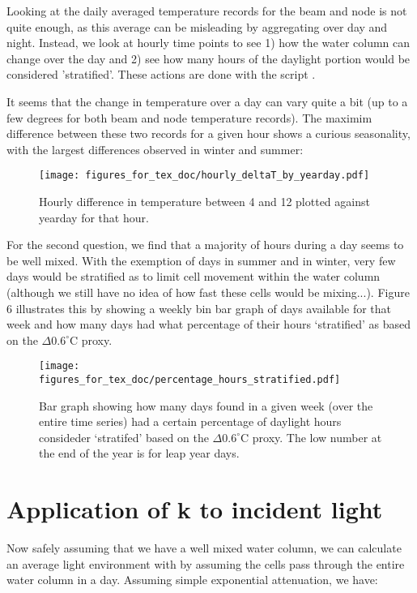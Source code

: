 \documentclass[11pt]{article}
\begin{document}
Looking at the daily averaged temperature records for the beam and node is not quite enough, as this average can be misleading by aggregating over day and night. Instead, we look at hourly time points to see 1) how the water column can change over the day and 2) see how many hours of the daylight portion would be considered 'stratified'. These actions are done with the script .

It seems that the change in temperature over a day can vary quite a bit (up to a few degrees for both beam and node temperature records). The maximim difference between these two records for a given hour shows a curious seasonality, with the largest differences observed in winter and summer:

 \begin{figure}[h]
\centering
\texttt{[image: figures\_for\_tex\_doc/hourly\_deltaT\_by\_yearday.pdf]}
\caption{Hourly difference in temperature between 4 and 12 plotted against yearday for that hour.}
\end{figure}

For the second question, we find that a majority of hours during a day seems to be well mixed. With the exemption of days in summer and in winter, very few days would be stratified as to limit cell movement within the water column (although we still have no idea of how fast these cells would be mixing...).  Figure 6 illustrates this by showing a weekly bin bar graph of days available for that week and how many days had what percentage of their hours `stratified' as based on the $\Delta0.6 ^{\circ}$C proxy.

 \begin{figure}[h]
\centering
\texttt{[image: figures\_for\_tex\_doc/percentage\_hours\_stratified.pdf]}
\caption{Bar graph showing how many days found in a given week (over the entire time series) had a certain percentage of daylight hours consideder `stratifed' based on the $\Delta0.6 ^{\circ}$C proxy. The low number at the end of the year is for leap year days.}
\end{figure}

\clearpage
\section{Application of k to incident light}

Now safely assuming that we have a well mixed water column, we can calculate an average light environment with  by assuming the cells pass through the entire water column in a day. Assuming simple exponential attenuation, we have:
\end{document}
